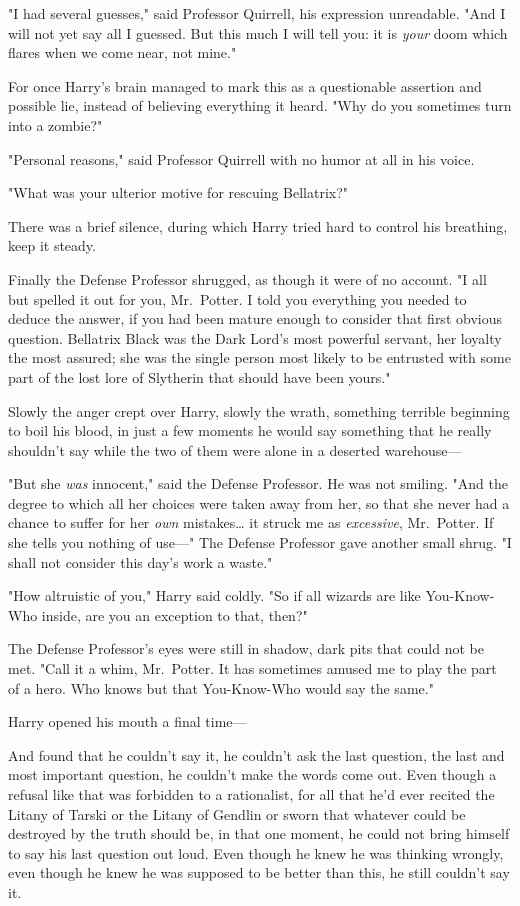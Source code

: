 "I had several guesses," said Professor Quirrell, his expression unreadable.
"And I will not yet say all I guessed. But this much I will tell you: it is
\emph{your} doom which flares when we come near, not mine."

For once Harry's brain managed to mark this as a questionable assertion and
possible lie, instead of believing everything it heard. "Why do you sometimes
turn into a zombie?"

"Personal reasons," said Professor Quirrell with no humor at all in his voice.

"What was your ulterior motive for rescuing Bellatrix?"

There was a brief silence, during which Harry tried hard to control his
breathing, keep it steady.

Finally the Defense Professor shrugged, as though it were of no account. "I all
but spelled it out for you, Mr.~Potter. I told you everything you needed to
deduce the answer, if you had been mature enough to consider that first obvious
question. Bellatrix Black was the Dark Lord's most powerful servant, her
loyalty the most assured; she was the single person most likely to be entrusted
with some part of the lost lore of Slytherin that should have been yours."

Slowly the anger crept over Harry, slowly the wrath, something terrible
beginning to boil his blood, in just a few moments he would say something that
he really shouldn't say while the two of them were alone in a deserted
warehouse---

"But she \emph{was} innocent," said the Defense Professor. He was not smiling.
"And the degree to which all her choices were taken away from her, so that she
never had a chance to suffer for her \emph{own} mistakes{\ldots} it struck me
as \emph{excessive}, Mr.~Potter. If she tells you nothing of use---" The
Defense Professor gave another small shrug. "I shall not consider this day's
work a waste."

"How altruistic of you," Harry said coldly. "So if all wizards are like
You-Know-Who inside, are you an exception to that, then?"

The Defense Professor's eyes were still in shadow, dark pits that could not be
met. "Call it a whim, Mr.~Potter. It has sometimes amused me to play the part
of a hero. Who knows but that You-Know-Who would say the same."

Harry opened his mouth a final time---

And found that he couldn't say it, he couldn't ask the last question, the last
and most important question, he couldn't make the words come out. Even though a
refusal like that was forbidden to a rationalist, for all that he'd ever
recited the Litany of Tarski or the Litany of Gendlin or sworn that whatever
could be destroyed by the truth should be, in that one moment, he could not
bring himself to say his last question out loud. Even though he knew he was
thinking wrongly, even though he knew he was supposed to be better than this,
he still couldn't say it.

